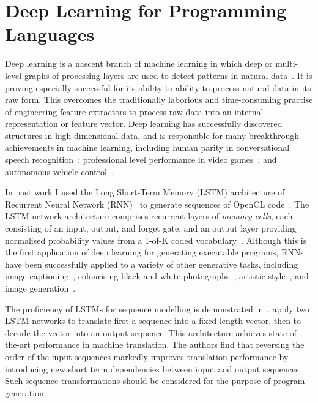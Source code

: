 \section{Deep Learning for Programming Languages}
\label{sec:related-work-machine-learning-for-pl}

Deep learning is a nascent branch of machine learning in which deep or multi-level graphs of processing layers are used to detect patterns in natural data~\cite{Buduma2015,LeCun2015}. It is proving especially successful for its ability to ability to process natural data in its raw form. This overcomes the traditionally laborious and time-consuming practise of engineering feature extractors to process raw data into an internal representation or feature vector. Deep learning has successfully discovered structures in high-dimensional data, and is responsible for many breakthrough achievements in machine learning, including human parity in conversational speech recognition~\cite{Xiong2016}; professional level performance in video games~\cite{Mnih2015}; and autonomous vehicle control~\cite{Lozano-Perez2012}.

In past work I used the Long Short-Term Memory (LSTM) architecture of Recurrent Neural Network (RNN)~\cite{Sundermeyer2012,Mikolov2015} to generate sequences of OpenCL code~\cite{Cummins2017a}. The LSTM network architecture comprises recurrent layers of \emph{memory cells}, each consisting of an input, output, and forget gate, and an output layer providing normalised probability values from a 1-of-K coded vocabulary~\cite{Graves,Graves2013}. Although this is the first application of deep learning for generating executable programs, RNNs have been successfully applied to a variety of other generative tasks, including image captioning~\cite{Vinyals}, colourising black and white photographs~\cite{Zhang2016}, artistic style~\cite{Gatys2015}, and image generation~\cite{Gregor2014}.

The proficiency of LSTMs for sequence modelling is demonstrated in~\cite{Sutskever2014}. \citeauthor{Sutskever2014} apply two LSTM networks to translate first a sequence into a fixed length vector, then to decode the vector into an output sequence. This architecture achieves state-of-the-art performance in machine translation. The authors find that reversing the order of the input sequences markedly improves translation performance by introducing new short term dependencies between input and output sequences. Such sequence transformations should be considered for the purpose of program generation.

